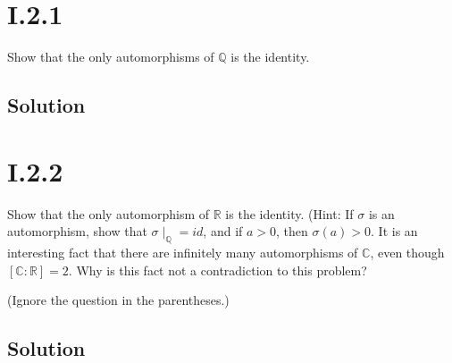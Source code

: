 \documentclass[fleqn]{article}
\begin{document}
    
    \section{I.2.1}
    Show that the only automorphisms of $\mathbb{Q}$ is the identity.
        
        \subsection{Solution}
        
    
    \section{I.2.2}
    Show that the only automorphism of $\mathbb{R}$ is the identity.  (Hint: If $\sigma$ is an automorphism, show that $\sigma\mid_\mathbb{Q} = id$, and if $a > 0$, then $\sigma(a) > 0$.  It is an interesting fact that there are infinitely many automorphisms of $\mathbb{C}$, even though $[\mathbb{C} : \mathbb{R}] = 2$.  Why is this fact not a contradiction to this problem?
    
    (Ignore the question in the parentheses.)
        
        \subsection{Solution}
        
    
\end{document}
